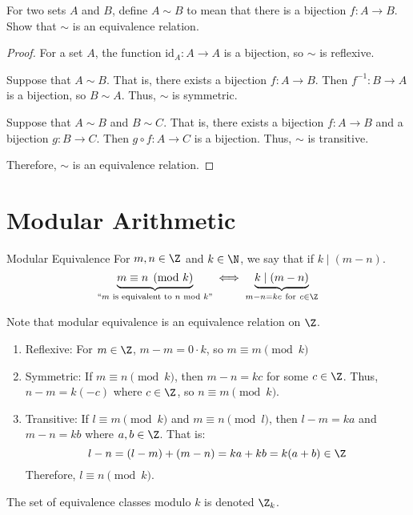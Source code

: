 \documentclass[letterpaper,12pt]{report}
\begin{document}
\begin{exbox}{}{}
    For two sets $A$ and $B$, define $A \sim B$ to mean that there is a bijection $f : A \to B$. Show that $\sim$ is an equivalence relation.
    \tcblower
    \begin{proof}
        For a set $A$, the function $\text{id}_A : A \to A$ is a bijection, so $\sim$ is reflexive.

        Suppose that $A \sim B$. That is, there exists a bijection $f : A \to B$. Then $f^{-1} : B \to A$ is a bijection, so $B \sim A$. Thus, $\sim$ is symmetric.

        Suppose that $A \sim B$ and $B \sim C$. That is, there exists a bijection $f : A \to B$ and a bijection $g : B \to C$. Then $g \circ f : A \to C$ is a bijection. Thus, $\sim$ is transitive.

        Therefore, $\sim$ is an equivalence relation.
    \end{proof}
\end{exbox}

\section{Modular Arithmetic}
\begin{dfnbox}{Modular Equivalence}{}
    For $m,n \in \Z$ and $k \in \N$, we say that  if $k \mid (m - n)$.
	\tcblower
    \[ \underbrace{m \equiv n \pmod{k}}_{\text{``$m$ is equivalent to $n$ mod $k$''}} \iff \underbrace{k \mid (m - n)}_{m-n = kc\ \text{for}\ c \in \Z} \]
\end{dfnbox}

Note that modular equivalence is an equivalence relation on $\Z$.
\begin{enumerate}
    \item Reflexive: For $m \in \Z$, $m - m = 0 \cdot k$, so $m \equiv m \pmod{k}$
    \item Symmetric: If $m \equiv n \pmod{k}$, then $m-n = kc$ for some $c \in \Z$. Thus, $n-m = k(-c)$ where $c \in \Z$, so $n \equiv m \pmod{k}$.
    \item Transitive: If $l \equiv m \pmod{k}$ and $m \equiv n \pmod{l}$, then $l-m = ka$ and $m-n = kb$ where $a,b \in \Z$. That is:
    \[l-n = (l-m) + (m-n) = ka + kb = k(a+b) \in \Z \]
    Therefore, $l \equiv n \pmod{k}$.
\end{enumerate}

The set of equivalence classes modulo $k$ is denoted $\Z_k$.
\end{document}
